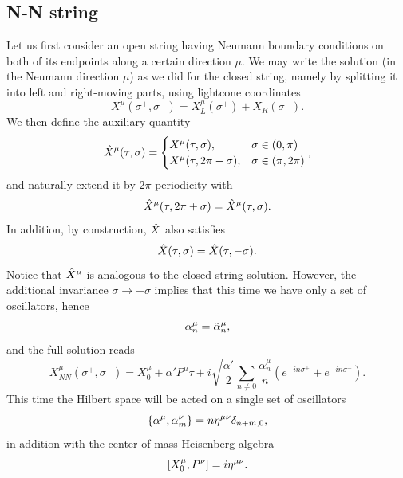 \subsection{N-N string}
Let us first consider an open string having Neumann boundary conditions on both of its endpoints along a certain direction $\mu$. We may write the solution (in the Neumann direction $\mu$) as we did for the closed string, namely by splitting it into left and right-moving parts, using lightcone coordinates 
\begin{equation}
    X^\mu(\sigma^+,\sigma^-) = X^\mu_L(\sigma^+) + X_R(\sigma^-).
\end{equation}
We then define the auxiliary quantity
\begin{equation}
    \hat{X}^\mu(\tau,\sigma) = 
    \begin{cases}
        X^\mu(\tau,\sigma), &\sigma \in (0,\pi) \\
        X^\mu(\tau,2\pi - \sigma), &\sigma \in (\pi,2\pi)
    \end{cases},
\end{equation}
and naturally extend it by $2\pi$-periodicity with
\begin{equation}
    \hat{X}^\mu(\tau,2\pi + \sigma) = \hat{X}^\mu(\tau,\sigma).    
\end{equation}
In addition, by construction, $\hat{X}$ also satisfies 
\begin{equation}
    \hat{X}(\tau,\sigma) = \hat{X}(\tau,-\sigma).
\end{equation}
Notice that $\hat{X}^\mu$ is analogous to the closed string solution. However, the additional invariance $\sigma \to -\sigma$ implies that this time we have only a set of oscillators, hence
\begin{equation}
    \alpha_n^\mu = \tilde{\alpha}_n^\mu,
\end{equation}
and the full solution reads 
\begin{equation}
    X_{NN}^\mu(\sigma^+,\sigma^-) = X_0^\mu + \alpha'P^\mu\tau + i\sqrt{\frac{\alpha'}{2}}\sum_{n \neq 0}\frac{\alpha_n^\mu}{n}(e^{-in\sigma^+} + e^{-in\sigma^-}).
\end{equation}
This time the Hilbert space will be acted on a single set of oscillators 
\begin{equation}
    \{\alpha^\mu,\alpha^\nu_m\} = n\eta^{\mu\nu}\delta_{n + m, 0},
\end{equation}
in addition with the center of mass Heisenberg algebra 
\begin{equation}
    [X_0^\mu,P^\nu] = i\eta^{\mu\nu}.
\end{equation}
